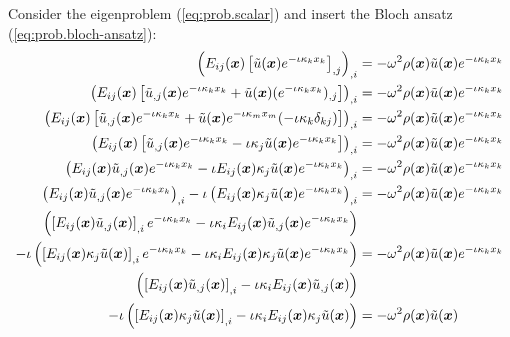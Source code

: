 Consider the eigenproblem (\ref{eq:prob.scalar}) and insert the Bloch ansatz (\ref{eq:prob.bloch-ansatz}):
%
\begin{align*}
    \left(
        E_{ij}(\boldsymbol{x}) \left[\tilde{u}(\boldsymbol{x}) e^{-\iota \kappa_{k} x_{k}}\right]_{,j}
    \right)_{,i} &=
    -\omega^2 \rho(\boldsymbol{x}) \tilde{u}(\boldsymbol{x}) e^{-\iota \kappa_{k} x_{k}} \\
    \left(
        E_{ij}(\boldsymbol{x}) \left[
            \tilde{u}_{,j}(\boldsymbol{x}) e^{-\iota \kappa_{k} x_{k}}
            + \tilde{u}(\boldsymbol{x}) (e^{-\iota \kappa_{k} x_{k}})_{,j}
        \right]
    \right)_{,i} &=
    -\omega^2 \rho(\boldsymbol{x}) \tilde{u}(\boldsymbol{x}) e^{-\iota \kappa_{k} x_{k}} \\
    \left(
        E_{ij}(\boldsymbol{x}) \left[
            \tilde{u}_{,j}(\boldsymbol{x}) e^{-\iota \kappa_{k} x_{k}}
            + \tilde{u}(\boldsymbol{x}) e^{-\iota \kappa_{m} x_{m}} (-\iota \kappa_{k} \delta_{kj})
        \right]
    \right)_{,i} &=
    -\omega^2 \rho(\boldsymbol{x}) \tilde{u}(\boldsymbol{x}) e^{-\iota \kappa_{k} x_{k}} \\
    \left(
        E_{ij}(\boldsymbol{x}) \left[
            \tilde{u}_{,j}(\boldsymbol{x}) e^{-\iota \kappa_{k} x_{k}}
            - \iota \kappa_{j} \tilde{u}(\boldsymbol{x}) e^{-\iota \kappa_{k} x_{k}}
        \right]
    \right)_{,i} &=
    -\omega^2 \rho(\boldsymbol{x}) \tilde{u}(\boldsymbol{x}) e^{-\iota \kappa_{k} x_{k}} \\
    \left(
        E_{ij}(\boldsymbol{x}) \tilde{u}_{,j}(\boldsymbol{x}) e^{-\iota \kappa_{k} x_{k}}
        - \iota E_{ij}(\boldsymbol{x}) \kappa_{j} \tilde{u}(\boldsymbol{x}) e^{-\iota \kappa_{k} x_{k}}
    \right)_{,i} &=
    -\omega^2 \rho(\boldsymbol{x}) \tilde{u}(\boldsymbol{x}) e^{-\iota \kappa_{k} x_{k}} \\
    \left(
        E_{ij}(\boldsymbol{x}) \tilde{u}_{,j}(\boldsymbol{x}) e^{-\iota \kappa_{k} x_{k}}
    \right)_{,i}
    - \iota \left(
        E_{ij}(\boldsymbol{x}) \kappa_{j} \tilde{u}(\boldsymbol{x}) e^{-\iota \kappa_{k} x_{k}}
    \right)_{,i} &=
    -\omega^2 \rho(\boldsymbol{x}) \tilde{u}(\boldsymbol{x}) e^{-\iota \kappa_{k} x_{k}} \\
    \left(
        \left[
            E_{ij}(\boldsymbol{x}) \tilde{u}_{,j}(\boldsymbol{x})
        \right]_{,i} e^{-\iota \kappa_{k} x_{k}}
        -\iota \kappa_{i} E_{ij}(\boldsymbol{x}) \tilde{u}_{,j}(\boldsymbol{x}) e^{-\iota \kappa_{k} x_{k}}
    \right)& \\
    - \iota \left(
        \left[
            E_{ij}(\boldsymbol{x}) \kappa_{j} \tilde{u}(\boldsymbol{x})
        \right]_{,i} e^{-\iota \kappa_{k} x_{k}}
        - \iota \kappa_{i} E_{ij}(\boldsymbol{x}) \kappa_{j} \tilde{u}(\boldsymbol{x})
        e^{-\iota \kappa_{k} x_{k}}
    \right) &=
    -\omega^2 \rho(\boldsymbol{x}) \tilde{u}(\boldsymbol{x}) e^{-\iota \kappa_{k} x_{k}} \\
    \left(
        \left[
            E_{ij}(\boldsymbol{x}) \tilde{u}_{,j}(\boldsymbol{x})
        \right]_{,i}
        -\iota \kappa_{i} E_{ij}(\boldsymbol{x}) \tilde{u}_{,j}(\boldsymbol{x})
    \right)& \\
    - \iota \left(
        \left[
            E_{ij}(\boldsymbol{x}) \kappa_{j} \tilde{u}(\boldsymbol{x})
        \right]_{,i}
        - \iota \kappa_{i} E_{ij}(\boldsymbol{x}) \kappa_{j} \tilde{u}(\boldsymbol{x})
    \right) &=
    -\omega^2 \rho(\boldsymbol{x}) \tilde{u}(\boldsymbol{x})
\end{align*}

